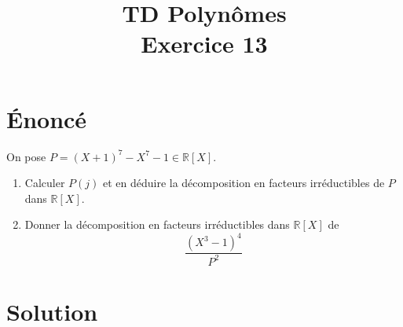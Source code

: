 \documentclass[french]{article}
\title{TD Polynômes \\ Exercice 13}
\date{}
\newcommand{\R}{\mathbb{R}}
\begin{document}
\maketitle

\section{Énoncé}
On pose $P=(X+1)^7-X^7-1\in\R[X]$.
\begin{enumerate}
	\item Calculer $P(j)$ et en déduire la décomposition en facteurs irréductibles de $P$ dans $\R[X]$.
	\item Donner la décomposition en facteurs irréductibles dans $\R[X]$ de $$\frac{(X^3-1)^4}{P^2}$$
\end{enumerate}
\section{Solution}
\end{document}
